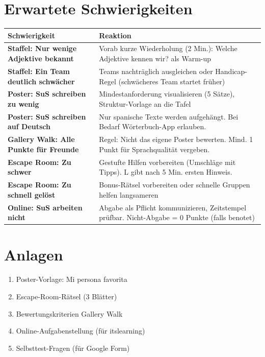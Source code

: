 \documentclass[11pt,a4paper]{article}
\begin{document}
\section{Erwartete Schwierigkeiten}

\begin{tabular}{|p{4.5cm}|p{8.5cm}|}
\hline
\textbf{Schwierigkeit} & \textbf{Reaktion} \\
\hline
\textbf{Staffel: Nur wenige Adjektive bekannt} & Vorab kurze Wiederholung (2 Min.): \glqq{}Welche Adjektive kennen wir?\grqq{} als Warm-up \\
\hline
\textbf{Staffel: Ein Team deutlich schwächer} & Teams nachträglich ausgleichen oder Handicap-Regel (schwächeres Team startet früher) \\
\hline
\textbf{Poster: SuS schreiben zu wenig} & Mindestanforderung visualisieren (5 Sätze), Struktur-Vorlage an die Tafel \\
\hline
\textbf{Poster: SuS schreiben auf Deutsch} & Nur spanische Texte werden aufgehängt. Bei Bedarf Wörterbuch-App erlauben. \\
\hline
\textbf{Gallery Walk: Alle Punkte für Freunde} & Regel: Nicht das eigene Poster bewerten. Mind. 1 Punkt für Sprachqualität vergeben. \\
\hline
\textbf{Escape Room: Zu schwer} & Gestufte Hilfen vorbereiten (Umschläge mit Tipps). L gibt nach 5 Min. ersten Hinweis. \\
\hline
\textbf{Escape Room: Zu schnell gelöst} & Bonus-Rätsel vorbereiten oder schnelle Gruppen helfen langsameren \\
\hline
\textbf{Online: SuS arbeiten nicht} & Abgabe als Pflicht kommunizieren, Zeitstempel prüfbar. Nicht-Abgabe = 0 Punkte (falls benotet) \\
\hline
\end{tabular}

\section{Anlagen}

\begin{enumerate}
    \item Poster-Vorlage: \glqq{}Mi persona favorita\grqq{}
    \item Escape-Room-Rätsel (3 Blätter)
    \item Bewertungskriterien Gallery Walk
    \item Online-Aufgabenstellung (für itslearning)
    \item Selbsttest-Fragen (für Google Form)
\end{enumerate}
\end{document}
